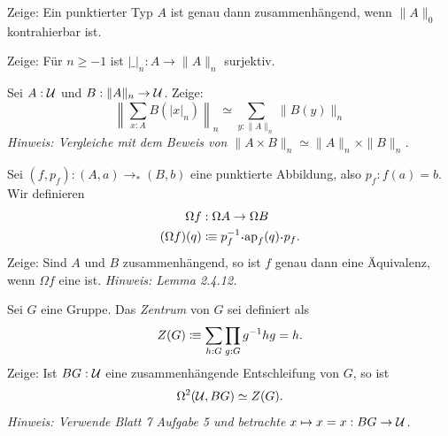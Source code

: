\documentclass{hott-übung}
\begin{document}
\setcounter{blattnummer}{9}
\setcounter{aufgabennummer}{0}

\blatt

\aufgabe{}
Zeige: Ein punktierter Typ \(A\) ist genau dann zusammenhängend, wenn \(\|A\|_0\) kontrahierbar ist.


\aufgabe{}
Zeige: Für \(n\geq -1\) ist \(|\_|_n:A\to \|A\|_n\) surjektiv.

\aufgabe{}
Sei \(A : \mathcal{U}\) und \(B : \|A\|_n \to \mathcal{U}\). Zeige:
\[\left\|\sum_{x:A}B(|x|_{n})\right\|_n\simeq \sum_{y:\|A\|_n}\|B(y)\|_n\]
\emph{Hinweis: Vergleiche mit dem Beweis von \(\|A \times B\|_n \simeq \|A\|_n \times \|B\|_n\).}

\aufgabe{}
Sei \((f,p_f) : (A,a) \to_\ast (B,b)\) eine punktierte Abbildung, also \(p_f : f(a) = b\).
Wir definieren
\begin{align*}
  \Omega f & : \Omega A \to \Omega B \\
  (\Omega f)(q) & \colonequiv p_f^{-1} \kon \ap_f(q) \kon p_f.
\end{align*}
Zeige: Sind \(A\) und \(B\) zusammenhängend, so ist \(f\) genau dann eine Äquivalenz, wenn \(\Omega f\) eine ist.
\emph{Hinweis: Lemma 2.4.12.}

\aufgabe{}
Sei \(G\) eine Gruppe.
Das \emph{Zentrum} von \(G\) sei definiert als
\[Z(G) \vcentcolon\mspace{-1.2mu}\equiv \sum_{h : G}\prod_{g : G} g^{-1}hg = h.\]
Zeige: Ist \(BG : \mathcal{U}\) eine zusammenhängende Entschleifung von \(G\), so ist
\[\Omega^2(\mathcal{U},BG) \simeq Z(G).\]
\emph{Hinweis: Verwende Blatt 7 Aufgabe 5 und betrachte \(x \mapsto x=x : BG \to \mathcal{U}\).}
\end{document}
